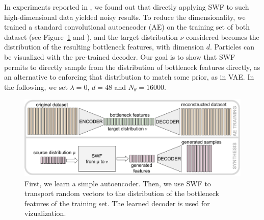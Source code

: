 In experiments reported in \supp, we found out that directly applying SWF to such high-dimensional data yielded noisy results. To reduce the dimensionality, we trained a standard convolutional autoencoder (AE) on the training set of both dataset (see Figure~\ref{fig:using_ae} and \supp), and the target distribution $\nu$ considered becomes the distribution of the resulting bottleneck features,
with dimension $d$. Particles can be visualized with the pre-trained decoder.
Our goal is to show that SWF permits to directly sample from the distribution of bottleneck features directly, as an alternative to enforcing that distribution to match some prior, as in VAE. In the following, we set $\lambda=0$, $d=48$ and $N_\theta=16000$.

\begin{figure}
\centering
\includegraphics[width=0.99\columnwidth]{figures/generating_bottleneck_features.pdf}
\caption{First, we learn a simple autoencoder. Then, we use SWF to transport random vectors to the distribution of the bottleneck features of the training set. The learned decoder is used for vizualization.}
\label{fig:using_ae}
\vspace{-10pt}
\end{figure}



